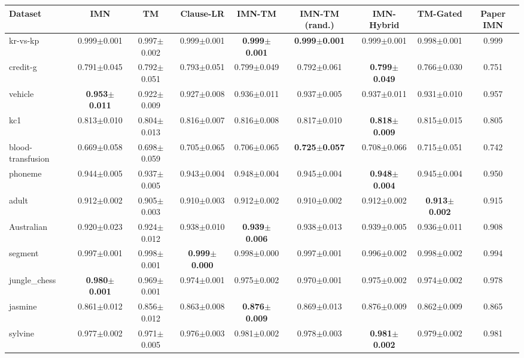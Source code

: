 \begin{tabular}{lcccccccc}
\toprule
Dataset & IMN & TM & Clause-LR & IMN-TM & IMN-TM (rand.) & IMN-Hybrid & TM-Gated & Paper IMN \\
\midrule
kr-vs-kp & 0.999{\tiny$\pm$0.001} & 0.997{\tiny$\pm$0.002} & 0.999{\tiny$\pm$0.001} & \textbf{0.999{\tiny$\pm$0.001}} & \textbf{0.999{\tiny$\pm$0.001}} & 0.999{\tiny$\pm$0.001} & 0.998{\tiny$\pm$0.001} & 0.999 \\
credit-g & 0.791{\tiny$\pm$0.045} & 0.792{\tiny$\pm$0.051} & 0.793{\tiny$\pm$0.051} & 0.799{\tiny$\pm$0.049} & 0.792{\tiny$\pm$0.061} & \textbf{0.799{\tiny$\pm$0.049}} & 0.766{\tiny$\pm$0.030} & 0.751 \\
vehicle & \textbf{0.953{\tiny$\pm$0.011}} & 0.922{\tiny$\pm$0.009} & 0.927{\tiny$\pm$0.008} & 0.936{\tiny$\pm$0.011} & 0.937{\tiny$\pm$0.005} & 0.937{\tiny$\pm$0.011} & 0.931{\tiny$\pm$0.010} & 0.957 \\
kc1 & 0.813{\tiny$\pm$0.010} & 0.804{\tiny$\pm$0.013} & 0.816{\tiny$\pm$0.007} & 0.816{\tiny$\pm$0.008} & 0.817{\tiny$\pm$0.010} & \textbf{0.818{\tiny$\pm$0.009}} & 0.815{\tiny$\pm$0.015} & 0.805 \\
blood-transfusion & 0.669{\tiny$\pm$0.058} & 0.698{\tiny$\pm$0.059} & 0.705{\tiny$\pm$0.065} & 0.706{\tiny$\pm$0.065} & \textbf{0.725{\tiny$\pm$0.057}} & 0.708{\tiny$\pm$0.066} & 0.715{\tiny$\pm$0.051} & 0.742 \\
phoneme & 0.944{\tiny$\pm$0.005} & 0.937{\tiny$\pm$0.005} & 0.943{\tiny$\pm$0.004} & 0.948{\tiny$\pm$0.004} & 0.945{\tiny$\pm$0.004} & \textbf{0.948{\tiny$\pm$0.004}} & 0.945{\tiny$\pm$0.004} & 0.950 \\
adult & 0.912{\tiny$\pm$0.002} & 0.905{\tiny$\pm$0.003} & 0.910{\tiny$\pm$0.003} & 0.912{\tiny$\pm$0.002} & 0.910{\tiny$\pm$0.002} & 0.912{\tiny$\pm$0.002} & \textbf{0.913{\tiny$\pm$0.002}} & 0.915 \\
Australian & 0.920{\tiny$\pm$0.023} & 0.924{\tiny$\pm$0.012} & 0.938{\tiny$\pm$0.010} & \textbf{0.939{\tiny$\pm$0.006}} & 0.938{\tiny$\pm$0.013} & 0.939{\tiny$\pm$0.005} & 0.936{\tiny$\pm$0.011} & 0.908 \\
segment & 0.997{\tiny$\pm$0.001} & 0.998{\tiny$\pm$0.001} & \textbf{0.999{\tiny$\pm$0.000}} & 0.998{\tiny$\pm$0.000} & 0.997{\tiny$\pm$0.001} & 0.996{\tiny$\pm$0.002} & 0.998{\tiny$\pm$0.002} & 0.994 \\
jungle\_chess & \textbf{0.980{\tiny$\pm$0.001}} & 0.969{\tiny$\pm$0.001} & 0.974{\tiny$\pm$0.001} & 0.975{\tiny$\pm$0.002} & 0.970{\tiny$\pm$0.001} & 0.975{\tiny$\pm$0.002} & 0.974{\tiny$\pm$0.002} & 0.978 \\
jasmine & 0.861{\tiny$\pm$0.012} & 0.856{\tiny$\pm$0.012} & 0.863{\tiny$\pm$0.008} & \textbf{0.876{\tiny$\pm$0.009}} & 0.869{\tiny$\pm$0.013} & 0.876{\tiny$\pm$0.009} & 0.862{\tiny$\pm$0.009} & 0.865 \\
sylvine & 0.977{\tiny$\pm$0.002} & 0.971{\tiny$\pm$0.005} & 0.976{\tiny$\pm$0.003} & 0.981{\tiny$\pm$0.002} & 0.978{\tiny$\pm$0.003} & \textbf{0.981{\tiny$\pm$0.002}} & 0.979{\tiny$\pm$0.002} & 0.981 \\
\bottomrule
\end{tabular}
